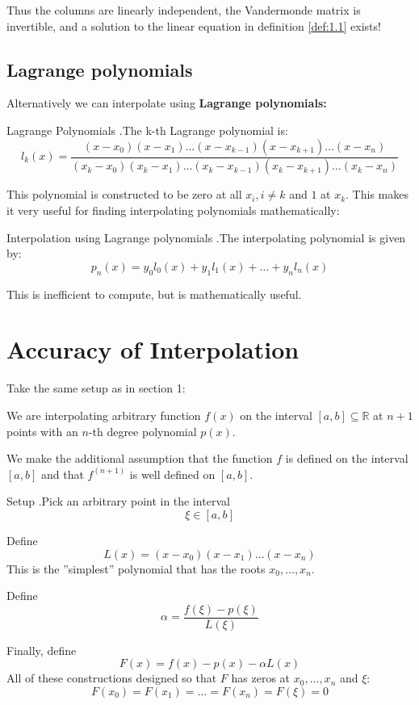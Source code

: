 \documentclass[12pt,letterpaper]{article}
\newcommand{\skipline}{\vspace{\baselineskip}}
\newcommand{\R}{\mathbb{R}}
\begin{document}
Thus the columns are linearly independent, the Vandermonde matrix is invertible, and a solution to the linear equation in definition \ref{def:1.1} exists!

\subsection{Lagrange polynomials}

Alternatively we can interpolate using \textbf{Lagrange polynomials:}
\begin{defn}{Lagrange Polynomials}
.The k-th Lagrange polynomial is:
\[
l_k(x) = \frac{(x-x_0)(x-x_1)\dots(x-x_{k-1})(x-x_{k+1})\dots(x-x_n)}{(x_k-x_0)(x_k-x_1)\dots(x_k-x_{k-1})(x_k-x_{k+1})\dots(x_k-x_n)}
\]
\label{def:lagrange}
\end{defn}

This polynomial is constructed to be zero at all $x_i, i\neq k$ and $1$ at $x_k$. This makes it very useful for finding interpolating polynomials mathematically:
\begin{theo}{Interpolation using Lagrange polynomials}
.The interpolating polynomial is given by:
$$p_n(x) = y_0 l_0(x) + y_1 l_1(x) + \dots + y_n l_n(x)$$
\label{thm:lagrange_interpolation}
\end{theo}
This is inefficient to compute, but is mathematically useful.

\section{Accuracy of Interpolation}

Take the same setup as in section 1:

We are interpolating arbitrary function $f(x)$ on the interval $[a, b] \subseteq \R$ at $n+1$ points with an $n$-th degree polynomial $p(x)$.

We make the additional assumption that the function $f$ is defined on the interval $[a,b]$ and that $f^{(n+1)}$ is well defined on $[a,b]$.

\begin{constr}{Setup}
.Pick an arbitrary point in the interval $$\xi \in [a,b]$$

Define
\begin{equation}\label{eq:def_L}
L(x) = (x-x_0)(x-x_1) \dots (x-x_n)
\end{equation}
This is the ''simplest'' polynomial that has the roots $x_0, \dots, x_n$.

\skipline

Define
\begin{equation}
\alpha = \frac{f(\xi) - p(\xi)}{L(\xi)}
\end{equation}

\skipline

Finally, define
\begin{equation}\label{eq:def_F}
F(x) = f(x) - p(x) - \alpha L(x)
\end{equation}
All of these constructions designed so that $F$ has zeros at $x_0, \dots, x_n$ and $\xi$:
\begin{equation}\label{eq:7}
F(x_0) = F(x_1) = \dots = F(x_n) = F(\xi) = 0
\end{equation}
\end{constr}
\end{document}
